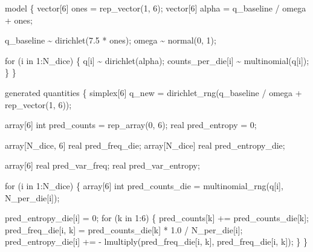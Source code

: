 \documentclass[
  letterpaper,
  DIV=11,
  numbers=noendperiod]{scrartcl}
\newenvironment{Shaded}{\begin{snugshade}}{\end{snugshade}}
\newcommand{\ControlFlowTok}[1]{\textcolor[rgb]{0.00,0.23,0.31}{#1}}
\newcommand{\DataTypeTok}[1]{\textcolor[rgb]{0.68,0.00,0.00}{#1}}
\newcommand{\DecValTok}[1]{\textcolor[rgb]{0.68,0.00,0.00}{#1}}
\newcommand{\FloatTok}[1]{\textcolor[rgb]{0.68,0.00,0.00}{#1}}
\newcommand{\KeywordTok}[1]{\textcolor[rgb]{0.00,0.23,0.31}{#1}}
\newcommand{\NormalTok}[1]{\textcolor[rgb]{0.00,0.23,0.31}{#1}}
\begin{document}
\begin{codelisting}
\begin{Shaded}
\begin{Highlighting}[]
\KeywordTok{model}\NormalTok{ \{}
  \DataTypeTok{vector}\NormalTok{[}\DecValTok{6}\NormalTok{] ones = rep\_vector(}\DecValTok{1}\NormalTok{, }\DecValTok{6}\NormalTok{);}
  \DataTypeTok{vector}\NormalTok{[}\DecValTok{6}\NormalTok{] alpha = q\_baseline / omega + ones;}

\NormalTok{  q\_baseline \textasciitilde{} dirichlet(}\FloatTok{7.5}\NormalTok{ * ones);}
\NormalTok{  omega \textasciitilde{} normal(}\DecValTok{0}\NormalTok{, }\DecValTok{1}\NormalTok{);}
  
  \ControlFlowTok{for}\NormalTok{ (i }\ControlFlowTok{in} \DecValTok{1}\NormalTok{:N\_dice) \{}
\NormalTok{    q[i] \textasciitilde{} dirichlet(alpha);}
\NormalTok{    counts\_per\_die[i] \textasciitilde{} multinomial(q[i]);}
\NormalTok{  \}}
\NormalTok{\}}

\KeywordTok{generated quantities}\NormalTok{ \{}
  \DataTypeTok{simplex}\NormalTok{[}\DecValTok{6}\NormalTok{] q\_new = dirichlet\_rng(q\_baseline / omega + rep\_vector(}\DecValTok{1}\NormalTok{, }\DecValTok{6}\NormalTok{));}

  \DataTypeTok{array}\NormalTok{[}\DecValTok{6}\NormalTok{] }\DataTypeTok{int}\NormalTok{ pred\_counts = rep\_array(}\DecValTok{0}\NormalTok{, }\DecValTok{6}\NormalTok{);}
  \DataTypeTok{real}\NormalTok{ pred\_entropy = }\DecValTok{0}\NormalTok{;}

  \DataTypeTok{array}\NormalTok{[N\_dice, }\DecValTok{6}\NormalTok{] }\DataTypeTok{real}\NormalTok{ pred\_freq\_die;}
  \DataTypeTok{array}\NormalTok{[N\_dice] }\DataTypeTok{real}\NormalTok{ pred\_entropy\_die;}

  \DataTypeTok{array}\NormalTok{[}\DecValTok{6}\NormalTok{] }\DataTypeTok{real}\NormalTok{ pred\_var\_freq;}
  \DataTypeTok{real}\NormalTok{ pred\_var\_entropy;}

  \ControlFlowTok{for}\NormalTok{ (i }\ControlFlowTok{in} \DecValTok{1}\NormalTok{:N\_dice) \{}
    \DataTypeTok{array}\NormalTok{[}\DecValTok{6}\NormalTok{] }\DataTypeTok{int}\NormalTok{ pred\_counts\_die = multinomial\_rng(q[i], N\_per\_die[i]);}

\NormalTok{    pred\_entropy\_die[i] = }\DecValTok{0}\NormalTok{;}
    \ControlFlowTok{for}\NormalTok{ (k }\ControlFlowTok{in} \DecValTok{1}\NormalTok{:}\DecValTok{6}\NormalTok{) \{}
\NormalTok{      pred\_counts[k] += pred\_counts\_die[k];}
\NormalTok{      pred\_freq\_die[i, k] = pred\_counts\_die[k] * }\FloatTok{1.0}\NormalTok{ / N\_per\_die[i];}
\NormalTok{      pred\_entropy\_die[i] += {-} lmultiply(pred\_freq\_die[i, k],}
\NormalTok{                                         pred\_freq\_die[i, k]);}
\NormalTok{    \}}
\NormalTok{  \}}


\end{Highlighting}
\end{Shaded}
\end{codelisting}
\end{document}
